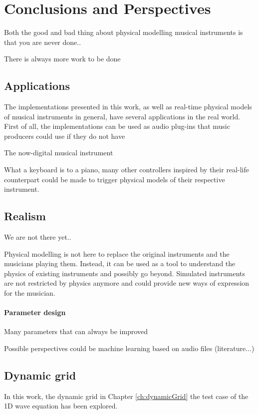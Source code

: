 \chapter{Conclusions and Perspectives}\label{ch:conclusion}
Both the good and bad thing about physical modelling musical instruments is that you are never done..

There is always more work to be done

\section{Applications}
The implementations presented in this work, as well as real-time physical models of musical instruments in general, have several applications in the real world. First of all, the implementations can be used as audio plug-ins that music producers could use if they do not have


The now-digital musical instrument 

What a keyboard is to a piano, many other controllers inspired by their real-life counterpart could be made to trigger physical models of their respective instrument.
\section{Realism}
We are not there yet.. 

Physical modelling is not here to replace the original instruments and the musicians playing them. Instead, it can be used as a tool to understand the physics of existing instruments and possibly go beyond. Simulated instruments are not restricted by physics anymore and could provide new ways of expression for the musician. 

\subsubsection{Parameter design}
Many parameters that can always be improved

Possible perspectives could be machine learning based on audio files (literature...)

\section{Dynamic grid}
In this work, the dynamic grid in Chapter \ref{ch:dynamicGrid} the test case of the 1D wave equation has been explored. 